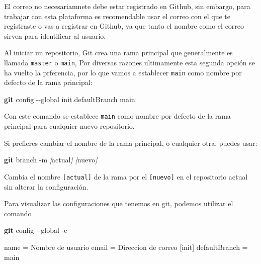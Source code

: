 \documentclass[
]{book}
\newenvironment{Shaded}{\begin{snugshade}}{\end{snugshade}}
\newcommand{\AttributeTok}[1]{\textcolor[rgb]{0.13,0.29,0.53}{#1}}
\newcommand{\ExtensionTok}[1]{#1}
\newcommand{\FunctionTok}[1]{\textcolor[rgb]{0.13,0.29,0.53}{\textbf{#1}}}
\newcommand{\NormalTok}[1]{#1}
\newcommand{\PreprocessorTok}[1]{\textcolor[rgb]{0.56,0.35,0.01}{\textit{#1}}}
\newcommand{\SpecialStringTok}[1]{\textcolor[rgb]{0.31,0.60,0.02}{#1}}
\begin{document}
El correo no necesariamnete debe estar registrado en Github, sin embargo, para trabajar con esta plataforma es recomendable usar el correo con el que te registraste o vas a registrar en Github, ya que tanto el nombre como el correo sirven para identificar al usuario.

Al iniciar un repositorio, Git crea una rama principal que generalmente es llamada \texttt{master} o \texttt{main}, Por diversas razones ultimamente esta segunda opción se ha vuelto la prferencia, por lo que vamos a establecer \texttt{main} como nombre por defecto de la rama principal:

\begin{Shaded}
\begin{Highlighting}[]
\FunctionTok{git}\NormalTok{ config }\AttributeTok{{-}{-}global}\NormalTok{ init.defaultBranch main}
\end{Highlighting}
\end{Shaded}

Con este comando se establece \texttt{main} como nombre por defecto de la rama principal para cualquier nuevo repositorio.

Si prefieres cambiar el nombre de la rama principal, o cualquier otra, puedes usar:

\begin{Shaded}
\begin{Highlighting}[]
\FunctionTok{git}\NormalTok{ branch }\AttributeTok{{-}m} \PreprocessorTok{[}\SpecialStringTok{actual}\PreprocessorTok{]} \PreprocessorTok{[}\SpecialStringTok{nuevo}\PreprocessorTok{]}
\end{Highlighting}
\end{Shaded}

Cambia el nombre \texttt{{[}actual{]}} de la rama por el \texttt{{[}nuevo{]}} en el repositorio actual sin alterar la configuración.

Para visualizar las configuraciones que tenemos en git, podemos utilizar el comando

\begin{Shaded}
\begin{Highlighting}[]
\FunctionTok{git}\NormalTok{ config }\AttributeTok{{-}{-}global} \AttributeTok{{-}e}
\end{Highlighting}
\end{Shaded}

\begin{Shaded}
\begin{Highlighting}[]
\ExtensionTok{[user]}
  \ExtensionTok{name}\NormalTok{ = Nombre de usuario}
  \ExtensionTok{email}\NormalTok{ = Direccion de correo}
\ExtensionTok{[init]}
  \ExtensionTok{defaultBranch}\NormalTok{ = main}
\end{Highlighting}
\end{Shaded}
\end{document}
